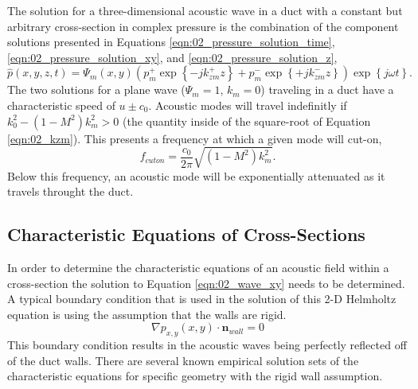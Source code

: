 The solution for a three-dimensional acoustic wave in a duct with a constant but arbitrary cross-section in complex pressure is the combination of the component solutions presented in Equations \ref{eqn:02_pressure_solution_time}, \ref{eqn:02_pressure_solution_xy}, and \ref{eqn:02_pressure_solution_z},
\begin{equation}
  \hat{p}(x,y,z,t) = \Psi_m(x,y)\left(p^+_m\exp{\left\{-jk^+_{zm}z\right\}}+p^-_m\exp{\left\{+jk^-_{zm}z\right\}}\right)\exp\left\{j\omega t\right\} \textrm{.}
  \label{eqn:02_pressure_solution_duct}
\end{equation}
The two solutions for a plane wave ($\Psi_m=1$, $k_m=0$) traveling in a duct have a characteristic speed of $u\pm c_0$.
Acoustic modes will travel indefinitly if $k_0^2-(1-M^2)k_m^2>0$ (the quantity inside of the square-root of Equation \ref{eqn:02_kzm}).
This presents a frequency at which a given mode will cut-on,
\begin{equation}
  f_{cuton} = \frac{c_0}{2\pi}\sqrt{(1-M^2)k_m^2} \textrm{.}
  \label{eqn:02_cuton_freq}
\end{equation}
Below this frequency, an acoustic mode will be exponentially attenuated as it travels throught the duct.

\subsection{Characteristic Equations of Cross-Sections}
In order to determine the characteristic equations of an acoustic field within a cross-section the solution to Equation \ref{eqn:02_wave_xy} needs to be determined.
A typical boundary condition that is used in the solution of this 2-D Helmholtz equation is using the assumption that the walls are rigid.
\begin{equation}
  \nabla p_{x,y}(x,y)\cdot\mathbf{n}_{wall} = 0
  \label{eqn:02_bc_rigig_wall}
\end{equation}
This boundary condition results in the acoustic waves being perfectly reflected off of the duct walls.
There are several known empirical solution sets of the characteristic equations for specific geometry with the rigid wall assumption.

